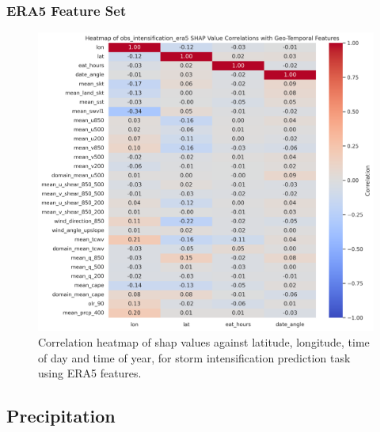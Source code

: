 \subsubsection{ERA5 Feature Set}
\begin{figure}[ht]
    \centering
    \includegraphics[width=\textwidth]{../figures/generated/experiments/obs_intensification/obs_intensification_era5_shap_correlation_heatmap.png}
    \caption{Correlation heatmap of \acrshort{shap} values against latitude, longitude, time of day and time of year, for storm intensification prediction task using ERA5 features.}
    \label{fig:obs_intensification_era5_shap_heatmap}
\end{figure}

\subsection{Precipitation}
\label{appn:shap-heatmaps-precip}

